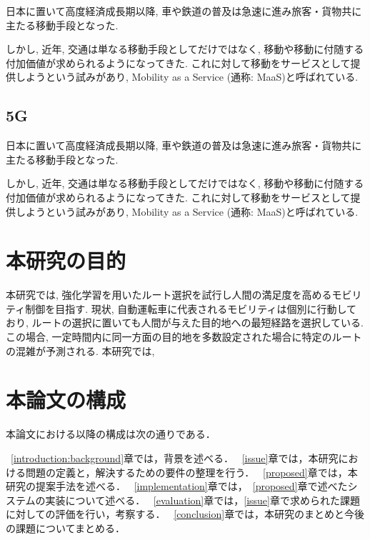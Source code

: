 日本に置いて高度経済成長期以降, 車や鉄道の普及は急速に進み旅客・貨物共に主たる移動手段となった.

しかし, 近年, 交通は単なる移動手段としてだけではなく, 移動や移動に付随する付加価値が求められるようになってきた.
これに対して移動をサービスとして提供しようという試みがあり, Mobility as a Service (通称: MaaS)と呼ばれている.


\subsection{5G}

日本に置いて高度経済成長期以降, 車や鉄道の普及は急速に進み旅客・貨物共に主たる移動手段となった.

しかし, 近年, 交通は単なる移動手段としてだけではなく, 移動や移動に付随する付加価値が求められるようになってきた.
これに対して移動をサービスとして提供しようという試みがあり, Mobility as a Service (通称: MaaS)と呼ばれている.


\section{本研究の目的}

本研究では, 強化学習を用いたルート選択を試行し人間の満足度を高めるモビリティ制御を目指す.
現状, 自動運転車に代表されるモビリティは個別に行動しており, ルートの選択に置いても人間が与えた目的地への最短経路を選択している.
この場合, 一定時間内に同一方面の目的地を多数設定された場合に特定のルートの混雑が予測される.
本研究では, 



\section{本論文の構成}

本論文における以降の構成は次の通りである．

~\ref{introduction:background}章では，背景を述べる．
~\ref{issue}章では，本研究における問題の定義と，解決するための要件の整理を行う．
~\ref{proposed}章では，本研究の提案手法を述べる．
~\ref{implementation}章では，~\ref{proposed}章で述べたシステムの実装について述べる．
~\ref{evaluation}章では，\ref{issue}章で求められた課題に対しての評価を行い，考察する．
~\ref{conclusion}章では，本研究のまとめと今後の課題についてまとめる．


